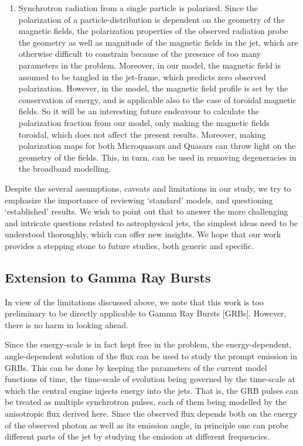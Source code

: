 \begin{enumerate}
\item Synchrotron radiation from a single particle is polarized. Since the polarization of a particle-distribution is dependent on the geometry of the magnetic fields, the polarization properties of the observed radiation probe the geometry as well as magnitude of the magnetic fields in the jet, which are otherwise difficult to constrain because of the presence of too many parameters in the problem. Moreover, in our model, the magnetic field is assumed to be tangled in the jet-frame, which predicts zero observed polarization. However, in the  model, the magnetic field profile is set by the conservation of energy, and is applicable also to the case of toroidal magnetic fields. So it will be an interesting future endeavour to calculate the polarization fraction from our model, only making the magnetic fields toroidal, which does not affect the present results. Moreover, making polarization maps for both Microquasars and Quasars can throw light on the geometry of the fields. This, in turn, can be used in removing degeneracies in the broadband modelling.

\end{enumerate}


Despite the several assumptions, caveats and limitations in our study, we try to emphasize the importance of reviewing `standard' models, and questioning `established' results. We wish to point out that to answer the more challenging and intricate questions related to astrophysical jets, the simplest ideas need to be understood thoroughly, which can offer new insights. We hope that our work provides a stepping stone to future studies, both generic and specific.



\subsection{Extension to Gamma Ray Bursts}
In view of the limitations discussed above, we note that this work is too preliminary to be directly applicable to Gamma Ray Bursts [GRBs]. However, there is no harm in looking ahead.

Since the energy-scale is in fact kept free in the problem, the energy-dependent, angle-dependent solution of the flux can be used to study the prompt emission in GRBs. This can be done by keeping the parameters of the current model functions of time, the time-scale of evolution being governed by the time-scale at which the central engine injects energy into the jets. That is, the GRB pulses can be treated as multiple synchrotron pulses, each of them being modelled by the anisotropic flux derived here. Since the observed flux depends both on the energy of the observed photon as well as its emission angle, in principle one can probe different parts of the jet by studying the emission at different frequencies.


